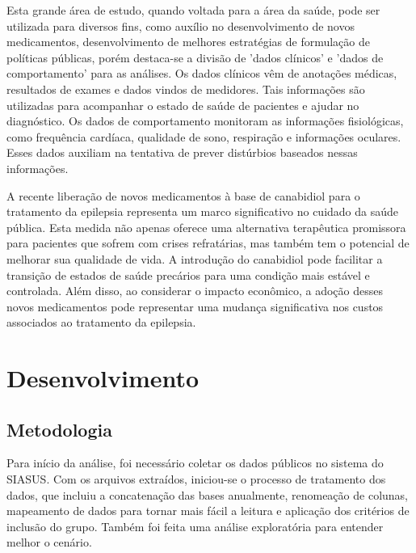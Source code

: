 \documentclass[article,a4paper,12pt,brazil,sumario=tradicional]{abntex2}
\begin{document}
Esta grande área de estudo, quando voltada para a área da saúde, pode ser utilizada para diversos fins, como auxílio no desenvolvimento de novos medicamentos, desenvolvimento de melhores estratégias de formulação de políticas públicas, porém destaca-se a divisão de 'dados clínicos' e 'dados de comportamento' para as análises. Os dados clínicos vêm de anotações médicas, resultados de exames e dados vindos de medidores. Tais informações são utilizadas para acompanhar o estado de saúde de pacientes e ajudar no diagnóstico. Os dados de comportamento monitoram as informações fisiológicas, como frequência cardíaca, qualidade de sono, respiração e informações oculares. Esses dados auxiliam na tentativa de prever distúrbios baseados nessas informações.

A recente liberação de novos medicamentos à base de canabidiol para o tratamento da epilepsia representa um marco significativo no cuidado da saúde pública. Esta medida não apenas oferece uma alternativa terapêutica promissora para pacientes que sofrem com crises refratárias, mas também tem o potencial de melhorar sua qualidade de vida. A introdução do canabidiol pode facilitar a transição de estados de saúde precários para uma condição mais estável e controlada. Além disso, ao considerar o impacto econômico, a adoção desses novos medicamentos pode representar uma mudança significativa nos custos associados ao tratamento da epilepsia.

\section{Desenvolvimento}

\subsection{Metodologia}

Para início da análise, foi necessário coletar os dados públicos no sistema do SIASUS. Com os arquivos extraídos, iniciou-se o processo de tratamento dos dados, que incluiu a concatenação das bases anualmente, renomeação de colunas, mapeamento de dados para tornar mais fácil a leitura e aplicação dos critérios de inclusão do grupo. Também foi feita uma análise exploratória para entender melhor o cenário.
\end{document}

